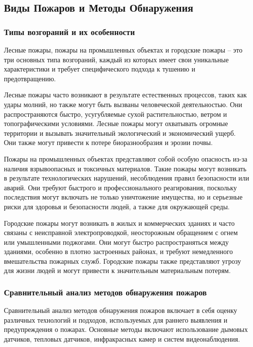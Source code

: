 \subsection{Виды Пожаров и Методы Обнаружения}
\subsubsection{Типы возгораний и их особенности}
Лесные пожары, пожары на промышленных объектах и городские пожары – это три основных типа возгораний, каждый из которых имеет свои уникальные характеристики и требует специфического подхода к тушению и предотвращению.

Лесные пожары часто возникают в результате естественных процессов, таких как удары молний, но также могут быть вызваны человеческой деятельностью. Они распространяются быстро, усугубляемые сухой растительностью, ветром и топографическими условиями. Лесные пожары могут охватывать огромные территории и вызывать значительный экологический и экономический ущерб. Они также могут привести к потере биоразнообразия и эрозии почвы.

Пожары на промышленных объектах представляют собой особую опасность из-за наличия взрывоопасных и токсичных материалов. Такие пожары могут возникать в результате технологических нарушений, несоблюдения правил безопасности или аварий. Они требуют быстрого и профессионального реагирования, поскольку последствия могут включать не только уничтожение имущества, но и серьезные риски для здоровья и безопасности людей, а также для окружающей среды.

Городские пожары могут возникать в жилых и коммерческих зданиях и часто связаны с неисправной электропроводкой, неосторожным обращением с огнем или умышленными поджогами. Они могут быстро распространяться между зданиями, особенно в плотно застроенных районах, и требуют немедленного вмешательства пожарных служб. Городские пожары также представляют угрозу для жизни людей и могут привести к значительным материальным потерям.
\subsubsection{Сравнительный анализ методов обнаружения пожаров}
Сравнительный анализ методов обнаружения пожаров включает в себя оценку различных технологий и подходов, используемых для раннего выявления и предупреждения о пожарах. Основные методы включают использование дымовых датчиков, тепловых датчиков, инфракрасных камер и систем видеонаблюдения.


